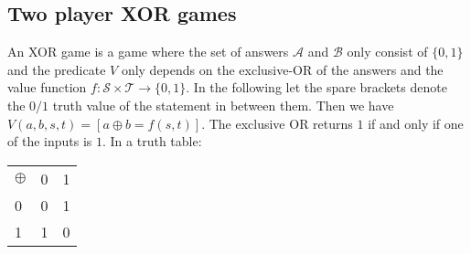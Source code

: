 \subsection{Two player XOR games}
An XOR game is a game where the set of answers $\mathcal{A}$ and $\mathcal{B}$ only consist of $\{ 0,1 \}$ and the predicate $V$ only depends on the exclusive-OR of the answers and the value function $f : \mathcal{S} \times \mathcal{T} \rightarrow \{ 0,1 \}$. In the following let the spare brackets denote the $0/1$ truth value of the statement in between them. Then we have $V(a,b,s,t) = \left[ a \oplus b = f(s,t) \right]$. 
The exclusive OR returns $1$ if and only if one of the inputs is $1$. In a truth table: \\
\begin{center}
	\begin{tabular}{l | c r }
		$\oplus$ & 0 & 1 \\
		\cline{1-3} 
		
		0 & 0 & 1 \\
		1 & 1 & 0 
	\end{tabular}\\
\end{center}

